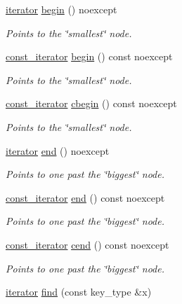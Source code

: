 \begin{DoxyCompactItemize}
\hyperlink{classbst_a9378fa7f3f48ee62f3a0b4d168d8d98b}{iterator} \hyperlink{classbst_a88986f214d0eb4f27a0aed7c0e43df8f}{begin} () noexcept
\begin{DoxyCompactList}\small\item\em Points to the \char`\"{}smallest\char`\"{} node. \end{DoxyCompactList}\item 
\hyperlink{classbst_1_1__iterator}{const\+\_\+iterator} \hyperlink{classbst_a6eaec5eeced2766a4dfbe194f60308c4}{begin} () const noexcept
\begin{DoxyCompactList}\small\item\em Points to the \char`\"{}smallest\char`\"{} node. \end{DoxyCompactList}\item 
\hyperlink{classbst_1_1__iterator}{const\+\_\+iterator} \hyperlink{classbst_a79997e0ce6b5e09285541ac17d5d079e}{cbegin} () const noexcept
\begin{DoxyCompactList}\small\item\em Points to the \char`\"{}smallest\char`\"{} node. \end{DoxyCompactList}\item 
\hyperlink{classbst_a9378fa7f3f48ee62f3a0b4d168d8d98b}{iterator} \hyperlink{classbst_ab07e1bc4d1d387578488777858b75934}{end} () noexcept
\begin{DoxyCompactList}\small\item\em Points to one past the \char`\"{}biggest\char`\"{} node. \end{DoxyCompactList}\item 
\hyperlink{classbst_1_1__iterator}{const\+\_\+iterator} \hyperlink{classbst_a2c398a1b2cf08de0833d476aaefea7dd}{end} () const noexcept
\begin{DoxyCompactList}\small\item\em Points to one past the \char`\"{}biggest\char`\"{} node. \end{DoxyCompactList}\item 
\hyperlink{classbst_1_1__iterator}{const\+\_\+iterator} \hyperlink{classbst_a42dd418f5e482a92208ff577e6b85989}{cend} () const noexcept
\begin{DoxyCompactList}\small\item\em Points to one past the \char`\"{}biggest\char`\"{} node. \end{DoxyCompactList}\item 
\hyperlink{classbst_a9378fa7f3f48ee62f3a0b4d168d8d98b}{iterator} \hyperlink{classbst_aa18c04b701015791c9211261cbc0390e}{find} (const key\+\_\+type \&x)

\end{DoxyCompactItemize}
